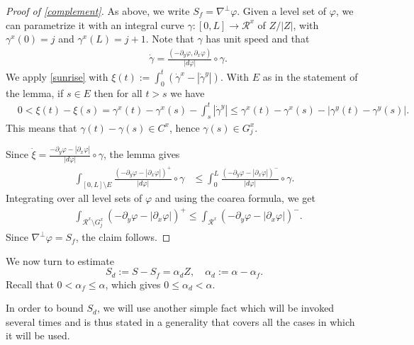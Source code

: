 \documentclass[11pt,a4paper]{amsart}
\newcommand{\de}{\partial}
\renewcommand{\phi}{\varphi}
\theoremstyle{definition}
\begin{document}
\begin{proof}[Proof of \cref{complement}]
	As above, we write $S_f=\nabla^\perp\phi$. Given a level set of $\phi$, we can parametrize it with an integral curve $\gamma:[0,L]\to\mathcal{R}^x$ of $Z/|Z|$, with $\gamma^x(0)=j$ and $\gamma^x(L)=j+1$.
	Note that $\gamma$ has unit speed and that
	\begin{align*}
		&\dot\gamma=\frac{(-\de_y\phi,\de_x\phi)}{|d\phi|}\circ\gamma.
	\end{align*}
	We apply \cref{sunrise} with
	$\xi(t):=\int_0^t(\dot\gamma^x-|\dot\gamma^y|)$.
	With $E$ as in the statement of the lemma, if $s\in E$ then for all $t>s$ we have
	\begin{align*}
		&0
		<\xi(t)-\xi(s)
		=\gamma^x(t)-\gamma^x(s)-\int_s^t|\dot\gamma^y|
		\le\gamma^x(t)-\gamma^x(s)-|\gamma^y(t)-\gamma^y(s)|.
	\end{align*}
	This means that $\gamma(t)-\gamma(s)\in C^x$, hence $\gamma(s)\in G_j^x$.
	
	Since $\dot\xi=\frac{-\de_y\phi-|\de_x\phi|}{|d\phi|}\circ\gamma$, the lemma gives
	\begin{align*}
		\int_{[0,L]\setminus E}\frac{(-\de_y\phi-|\de_x\phi|)^+}{|d\phi|}\circ\gamma
		&\le%
        \int_0^L\frac{(-\de_y\phi-|\de_x\phi|)^-}{|d\phi|}\circ\gamma.
	\end{align*}
	Integrating over all level sets of $\phi$ and using the coarea formula, we get
	\begin{align*}
		&\int_{\mathcal{R}^x\setminus G_j^x}(-\de_y\phi-|\de_x\phi|)^+
		\le\int_{\mathcal{R}^x}(-\de_y\phi-|\de_x\phi|)^-.
	\end{align*}
	Since $\nabla^\perp\phi=S_f$, the claim follows.
\end{proof}

We now turn to estimate
\begin{equation}\label{s.d.def}
    S_d:=S-S_f=\alpha_d Z,\quad \alpha_d:=\alpha-\alpha_f.
\end{equation}
Recall that $0<\alpha_f\le\alpha$, which gives $0\le\alpha_d<\alpha$.

In order to bound $S_d$, we will use another simple fact which will be invoked several times and is thus stated in a generality that covers all the cases in which it will be used.
\end{document}
